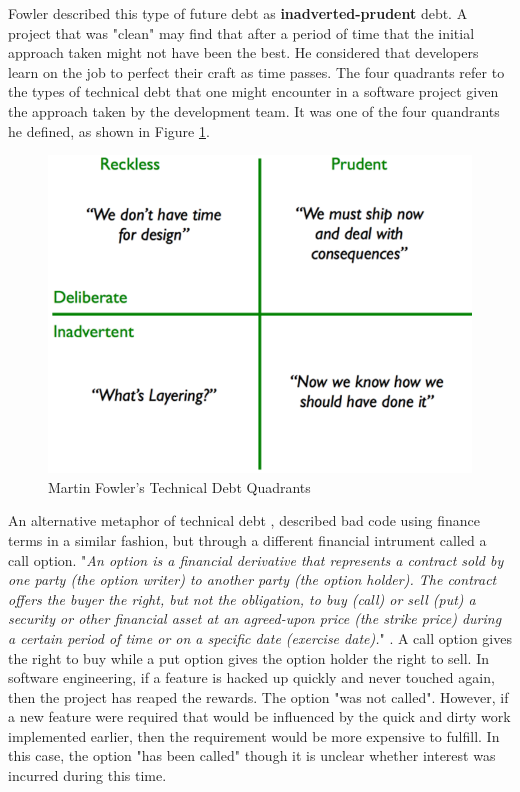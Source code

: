 \documentclass{mprop}
\begin{document}
Fowler \cite{TDMartin} described this type of future debt as
\textbf{inadverted-prudent} debt. A project that was "clean" may find that after
a period of time that the initial approach taken might not have been the best.
He considered that developers learn on the job to perfect their craft as time
passes. The four quadrants refer to the types of technical debt that one might
encounter in a software project given the approach taken by the development
team. It was one of the four quandrants he defined, as shown in Figure
\ref{fig:td-quandrants}.

\begin{figure}
	\centering
	\includegraphics[width=0.5\linewidth]{visualisations/TD_quadrants.png}
	\caption{Martin Fowler's Technical Debt Quadrants}
	\label{fig:td-quandrants}
\end{figure}


An alternative metaphor of technical debt \cite{UnhedgedCallOption}, described
bad code using finance terms in a similar fashion, but through a different
financial intrument called a call option. "\textit{An option is a financial
derivative that represents a contract sold by one party (the option writer) to
another party (the option holder). The contract offers the buyer the right, but
not the obligation, to buy (call) or sell (put) a security or other financial
asset at an agreed-upon price (the strike price) during a certain period of time
or on a specific date (exercise date).}" \cite{option-investopedia}. A call
option gives the right to buy while a put option gives the option holder the
right to sell. In software engineering, if a feature is hacked up quickly and
never touched again, then the project has reaped the rewards. The option "was
not called". However, if a new feature were required that would be influenced by
the quick and dirty work implemented earlier, then the requirement would be more
expensive to fulfill. In this case, the option "has been called" though it is
unclear whether interest was incurred during this time.
\end{document}
